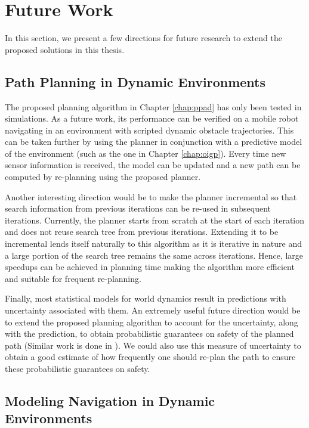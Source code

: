\section{Future Work}
\label{sec:conclusion-future-work}

In this section, we present a few directions for future research to extend the proposed solutions in this thesis.

\subsection{Path Planning in Dynamic Environments}
\label{sec:path-plann-dynam}

The proposed planning algorithm in Chapter \ref{chap:ppad} has only been tested in simulations. As a future work, its performance can be verified on a mobile robot navigating in an environment with scripted dynamic obstacle trajectories. This can be taken further by using the planner in conjunction with a predictive model of the environment (such as the one in Chapter \ref{chap:oigp}). Every time new sensor information is received, the model can be updated and a new path can be computed by re-planning using the proposed planner.

Another interesting direction would be to make the planner incremental so that search information from previous iterations can be re-used in subsequent iterations. Currently, the planner starts from scratch at the start of each iteration and does not reuse search tree from previous iterations. Extending it to be incremental lends itself naturally to this algorithm as it is iterative in nature and a large portion of the search tree remains the same across iterations. Hence, large speedups can be achieved in planning time making the algorithm more efficient and suitable for frequent re-planning.

Finally, most statistical models for world dynamics result in predictions with uncertainty associated with them. An extremely useful future direction would be to extend the proposed planning algorithm to account for the uncertainty, along with the prediction, to obtain probabilistic guarantees on safety of the planned path (Similar work is done in \cite{kushleyev2009time}). We could also use this measure of uncertainty to obtain a good estimate of how frequently one should re-plan the path to ensure these probabilistic guarantees on safety.

\subsection{Modeling Navigation in Dynamic Environments}
\label{sec:model-navig-dynam}

